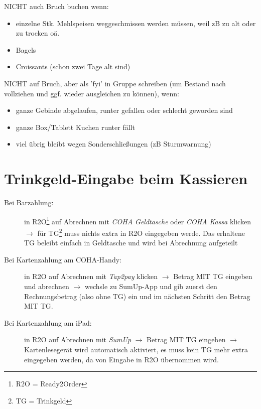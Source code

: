 \documentclass[a4paper,12pt]{article}
\newcounter{row}
\begin{document}
\vspace{2em}

NICHT auch Bruch buchen wenn:
\begin{itemize}[topsep=0pt, itemsep=1pt]
    \item[] einzelne Stk. Mehlspeisen weggeschmissen werden müssen, weil zB zu alt oder zu trocken oä.
    \item[] Bagels
    \item[] Croissants (schon zwei Tage alt sind)
\end{itemize}

\vspace{2em}

NICHT auf Bruch, aber als 'fyi' in Gruppe schreiben (um Bestand nach vollziehen und ggf. wieder ausgleichen zu können), wenn:
\begin{itemize}[topsep=0pt, itemsep=1pt]
    \item[] ganze Gebinde abgelaufen, runter gefallen oder schlecht geworden sind
    \item[] ganze Box/Tablett Kuchen runter fällt
    \item[] viel übrig bleibt wegen Sonderschließungen (zB Sturmwarnung)
\end{itemize}


\section{Trinkgeld-Eingabe beim Kassieren}

\begin{description}
    \item[Bei Barzahlung:]
    in R2O\footnote{R2O = Ready2Order} auf Abrechnen mit \textit{COHA Geldtasche} oder \textit{COHA Kassa} klicken $\rightarrow$ für TG\footnote{TG = Trinkgeld} muss nichts extra in R2O eingegeben werde. Das erhaltene TG beleibt einfach in Geldtasche und wird bei Abrechnung aufgeteilt
    \item[Bei Kartenzahlung am COHA-Handy:]
    in R2O auf Abrechnen mit \textit{Tap2pay} klicken $\rightarrow$ Betrag MIT TG eingeben und abrechnen $\rightarrow$ wechsle zu SumUp-App und gib zuerst den Rechnungsbetrag (also ohne TG) ein und im nächsten Schritt den Betrag MIT TG.
    \item[Bei Kartenzahlung am iPad:] 
    in R2O auf Abrechnen mit \textit{SumUp} $\rightarrow$ Betrag MIT TG eingeben $\rightarrow$ Kartenlesegerät wird automatisch aktiviert, es muss kein TG mehr extra eingegeben werden, da von Eingabe in R2O übernommen wird.
\end{description}
\end{document}

